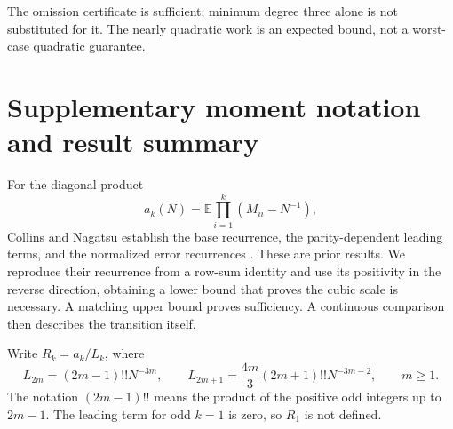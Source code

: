 \documentclass[11pt]{article}
\theoremstyle{definition}
\theoremstyle{remark}
\newcommand{\E}{\mathbb E}
\newcommand{\1}{\mathbf 1}
\begin{document}
The omission certificate is sufficient; minimum degree three alone is
not substituted for it. The nearly quadratic work is an expected bound,
not a worst-case quadratic guarantee.


\clearpage
\appendix
\section{Supplementary moment notation and result summary}\label{sec:moment-summary}

For the diagonal product
\[
a_k(N)=\E\prod_{i=1}^k(M_{ii}-N^{-1}),
\]
Collins and Nagatsu establish the base recurrence, the parity-dependent leading terms, and the normalized error recurrences \cite[Proposition 3.3]{CN}. These are prior results. We reproduce their recurrence from a row-sum identity and use its positivity in the reverse direction, obtaining a lower bound that proves the cubic scale is necessary. A matching upper bound proves sufficiency. A continuous comparison then describes the transition itself.



Write $R_k=a_k/L_k$, where
\begin{equation}\label{eq:leading}
L_{2m}=(2m-1)!!N^{-3m},\qquad
L_{2m+1}=\frac{4m}{3}(2m+1)!!N^{-3m-2},\qquad m\ge1.
\end{equation}
The notation $(2m-1)!!$ means the product of the positive odd integers up to $2m-1$. The leading term for odd $k=1$ is zero, so $R_1$ is not defined.
\end{document}
